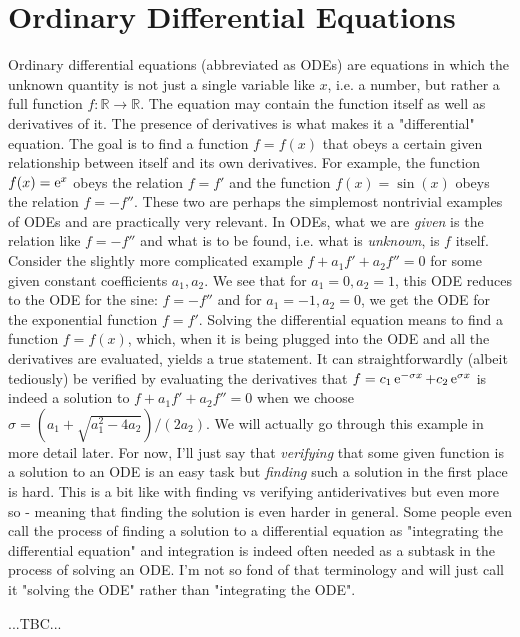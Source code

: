 \section{Ordinary Differential Equations} 
Ordinary differential equations (abbreviated as ODEs) are equations in which the unknown quantity is not just a single variable like $x$, i.e. a number, but rather a full function $f:\mathbb{R} \rightarrow \mathbb{R}$. The equation may contain the function itself as well as derivatives of it. The presence of derivatives is what makes it a "differential" equation. The goal is to find a function $f = f(x)$ that obeys a certain given relationship between itself and its own derivatives. For example, the function $f(x) = \operatorname{\mathrm{e}}^x$ obeys the relation $f = f'$ and the function $f(x) = \sin (x)$ obeys the relation $f = -f''$. These two are perhaps the simplemost nontrivial examples of ODEs and are practically very relevant. In ODEs, what we are \emph{given} is the relation like $f = -f''$ and what is to be found, i.e. what is \emph{unknown}, is $f$ itself. Consider the slightly more complicated example $f + a_1 f' + a_2 f'' = 0$ for some given constant coefficients $a_1, a_2$. We see that for $a_1 = 0, a_2 = 1$, this ODE reduces to the ODE for the sine: $f = -f''$ and for $a_1 = -1, a_2 = 0$, we get the ODE for the exponential function $f = f'$. Solving the differential equation means to find a function $f = f(x)$, which, when it is being plugged into the ODE and all the derivatives are evaluated, yields a true statement. It can straightforwardly (albeit tediously) be verified by evaluating the derivatives that $f = c_1 \operatorname{\mathrm{e}}^{-\sigma x} + c_2 \operatorname{\mathrm{e}}^{\sigma x}$ is indeed a solution to $f + a_1 f' + a_2 f'' = 0$ when we choose $\sigma = (a_1 + \sqrt{a_1^2 - 4 a_2})/(2 a_2)$. We will actually go through this example in more detail later. For now, I'll just say that \emph{verifying} that some given function is a solution to an ODE is an easy task but \emph{finding} such a solution in the first place is hard. This is a bit like with finding vs verifying antiderivatives but even more so - meaning that finding the solution is even harder in general. Some people even call the process of finding a solution to a differential equation as "integrating the differential equation" and integration is indeed often needed as a subtask in the process of solving an ODE. I'm not so fond of that terminology and will just call it "solving the ODE" rather than "integrating the ODE".

...TBC...


